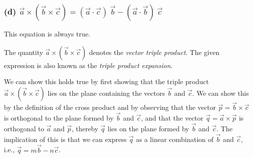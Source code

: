 \subsubsection*{(d) \( \vec{a} \times (\vec{b} \times \vec{c}) = (\vec{a} \cdot \vec{c})\ \vec{b} - (\vec{a} \cdot \vec{b})\ \vec{c} \)}

This equation is always true.

The quantity \( \vec{a} \times (\vec{b} \times \vec{c}) \) denotes the \textit{vector triple product}.
The given expression is also known as the \textit{triple product expansion}.

We can show this holds true by first showing that the triple product \( \vec{a} \times (\vec{b} \times \vec{c}) \) lies on the plane containing the vectors \( \vec{b} \) and  \( \vec{c} \).
We can show this by the definition of the cross product and by observing that the vector \( \vec{p} = \vec{b} \times \vec{c}\) is orthogonal to the plane formed by \( \vec{b} \) and  \( \vec{c} \), and that the vector \( \vec{q} = \vec{a} \times \vec{p} \) is orthogonal to \( \vec{a} \) and \( \vec{p} \), thereby \( \vec{q} \) lies on the plane formed by \( \vec{b} \) and  \( \vec{c} \).
The implication of this is that we can express \( \vec{q} \) as a linear combination of \( \vec{b} \) and  \( \vec{c} \), i.e., \( \vec{q} = m\vec{b} - n\vec{c} \).
